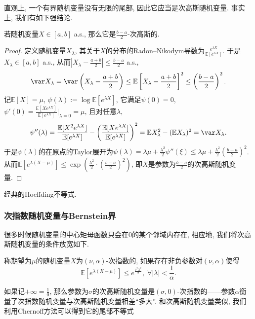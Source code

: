 直观上, 一个有界随机变量没有无限的尾部, 因此它应当是次高斯随机变量. 
事实上, 我们有如下强结论. 
\begin{lemma}[有界随机变量]\label{lemma:SubGaussianParameterOfBddRV}
	若随机变量$X \in [a, b]$ a.s., 那么它是$\frac{b-a}{2}$-次高斯的. 
\end{lemma}
\begin{proof}
	定义随机变量$X_{\lambda}$, 其关于$X$的分布的Radon–Nikodym导数为$\frac{e^{\lambda X}}{\mathbb{E}[e^{\lambda X}]}$. 
	于是$X_{\lambda} \in [a, b]$ a.s., 从而$\left|X_{\lambda} - \frac{a+b}{2} \right| \leq \frac{b-a}{2}$ a.s., 
	\begin{equation*}
		\var X_{\lambda}
		= \var \left(X_{\lambda} - \frac{a+b}{2} \right) 
		\leq \mathbb{E}\left[X_{\lambda} - \frac{a+b}{2} \right]^2 
		\leq \left(\frac{b-a}{2}\right)^2. 
	\end{equation*}
	记$\mathbb{E}[X] = \mu$, $\psi(\lambda) := \log \mathbb{E}[e^{\lambda X}]$, 它满足$\psi(0) = 0$, $\psi'(0) = \frac{\mathbb{E}[X e^{\lambda X}]}{\mathbb{E}[e^{\lambda X}]} \big|_{\lambda = 0} = \mu$, 且对任意$\lambda$,  
	\begin{equation*}
		\psi''(\lambda) 
		= \frac{\mathbb{E}[X^2 e^{\lambda X}]}{\mathbb{E}[e^{\lambda X}]} - \left( \frac{\mathbb{E}[X e^{\lambda X}]}{\mathbb{E}[e^{\lambda X}]} \right)^2
		= \mathbb{E}X_{\lambda}^2 - (\mathbb{E}X_{\lambda})^2
		= \var X_{\lambda}.  
	\end{equation*}
	于是$\psi(\lambda)$的在原点的Taylor展开为$\psi(\lambda) = \lambda \mu + \frac{\lambda^2}{2} \psi''(\xi) \leq \lambda \mu + \frac{\lambda^2}{2} \left(\frac{b-a}{2}\right)^2$. 
	从而$\mathbb{E}[e^{\lambda(X - \mu)}] \leq \exp\left(\frac{\lambda^2}{2} \cdot \left(\frac{b-a}{2}\right)^2\right)$, 即$X$是参数为$\frac{b-a}{2}$的次高斯随机变量. 
\end{proof}

\begin{corollary}
	经典的Hoeffding不等式. 
\end{corollary}


\subsubsection{次指数随机变量与Bernstein界}

很多时候随机变量的中心矩母函数只会在$0$的某个邻域内存在, 相应地, 我们将次高斯随机变量的条件放宽如下. 
\begin{definition}[次指数随机变量]
	称期望为$\mu$的随机变量$X$为$(\nu, \alpha)$-次指数的, 如果存在非负参数对$(\nu, \alpha)$使得
	\begin{equation*}
		\mathbb{E}[ e^{\lambda(X - \mu)} ] 
		\leq e^{\frac{\nu^2 \lambda^2}{2}},\; 
		\forall |\lambda| < \frac{1}{\alpha}. 
	\end{equation*}
\end{definition}
\noindent
如果记$+\infty = \frac10$, 那么参数为$\sigma$的次高斯随机变量是$(\sigma, 0)$-次指数的——参数$\alpha$衡量了次指数随机变量与次高斯随机变量相差“多大”. 
和次高斯随机变量类似, 我们利用Chernoff方法可以得到它的尾部不等式

